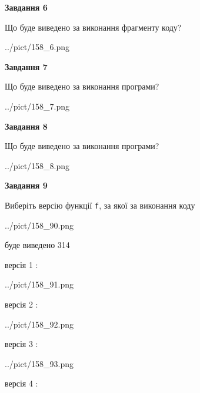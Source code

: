\documentclass[12pt, ukrainian]{article}
\def\code#1{\Verb!#1!}
\begin{document}
{\begin {large}
{\begin {center}\textbf{Завдання 6}\end {center}}

Що буде виведено за виконання фрагменту коду?\par
\begin{center}
	{../pict/158_6.png}
\end{center}
\newpage

{\begin {center}\textbf{Завдання 7}\end {center}}

Що буде виведено за виконання програми?\par
\begin{center}
	{../pict/158_7.png}
\end{center}
\newpage

{\begin {center}\textbf{Завдання 8}\end {center}}

Що буде виведено за виконання програми?\par
\begin{center}
	{../pict/158_8.png}
\end{center}
\newpage

{\begin {center}\textbf{Завдання 9}\end {center}}

Виберіть версію функції \code{f}, за якої за виконання коду
\begin{center}
	{../pict/158_90.png}
\end{center}
буде виведено 314

\vspace{5mm}
версія 1 :

\begin{center}
	{../pict/158_91.png}
\end{center}
версія 2 :

\begin{center}
	{../pict/158_92.png}
\end{center}
версія 3 :

\begin{center}
	{../pict/158_93.png}
\end{center}
версія 4 :


\end{large}}
\end{document}
